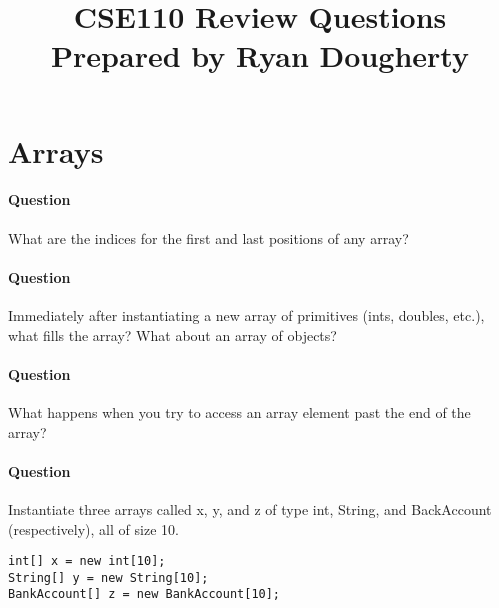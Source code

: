 \documentclass{article}
\date{}
\begin{document}
\title{\textbf{CSE110 Review Questions \\
Prepared by Ryan Dougherty}}
\maketitle

\section*{Arrays}


\setcounter{question_num}{1}
\paragraph{Question }
What are the indices for the first and last positions of any array?

\addtocounter{question_num}{1}
\paragraph{Question }
Immediately after instantiating a new array of primitives (ints, doubles, etc.), what fills the array? What about an array of objects?

\addtocounter{question_num}{1}
\paragraph{Question }
What happens when you try to access an array element past the end of the array?

\addtocounter{question_num}{1}
\paragraph{Question }
Instantiate three arrays called x, y, and z of type int, String, and BackAccount (respectively), all of size 10.
\begin{lstlisting}
int[] x = new int[10];
String[] y = new String[10];
BankAccount[] z = new BankAccount[10];
\end{lstlisting}
\end{document}
